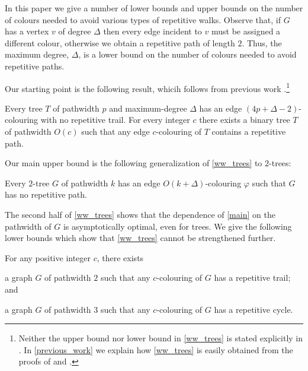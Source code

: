\documentclass[kpfonts]{patmorin}
\begin{document}
In this paper we give a number of lower bounds and upper bounds on the number of colours needed to avoid various types of repetitive walks. Observe that, if $G$ has a vertex $v$ of degree $\Delta$ then every edge incident to $v$ must be assigned a different colour, otherwise we obtain a repetitive path of length $2$. Thus, the maximum degree, $\Delta$, is a lower bound on the number of colours needed to avoid repetitive paths.

Our starting point is the following result, whicih follows from previous work \cite{wilson.wood:anagram-free,kamcev.luczak.ea:anagram-free}.\footnote{Neither the upper bound nor lower bound in \cref{ww_trees} is stated explicitly in \cite{wilson.wood:anagram-free,kamcev.luczak.ea:anagram-free}.  In \cref{previous_work} we explain how \cref{ww_trees} is easily obtained from the proofs of \cite[Theorems~2 and 13]{wilson.wood:anagram-free} and \cite[Proposition~2.1]{kamcev.luczak.ea:anagram-free}.}

\begin{thm}\label{ww_trees}
    Every tree $T$ of pathwidth $p$ and maximum-degree $\Delta$ has an edge $(4p+\Delta-2)$-colouring with no repetitive trail.  For every integer $c$ there exists a binary tree $T$ of pathwidth $O(c)$ such that any edge $c$-colouring of $T$ contains a repetitive path.
\end{thm}

Our main upper bound is the following generalization of \cref{ww_trees} to $2$-trees:

\begin{thm}\label{main}
    Every $2$-tree $G$ of pathwidth $k$ has an edge $O(k+\Delta)$-colouring $\varphi$ such that $G$ has no repetitive path.
\end{thm}

The second half of \cref{ww_trees} shows that the dependence of \cref{main} on the pathwidth of $G$ is asymptotically optimal, even for trees.  We give the following lower bounds which show that \cref{ww_trees} cannot be strengthened further.

\begin{thm}\label{lower-bounds}
    For any positive integer $c$, there exists
    \begin{compactenum}[(a)]
        \item a graph $G$ of pathwidth $2$ such that any $c$-colouring of $G$ has a repetitive trail; and \label{trail_lower_bound}
        \item a graph $G$ of pathwidth $3$ such that any $c$-colouring of $G$ has a repetitive cycle.\label{lower_bound}
    \end{compactenum}
\end{thm}
\end{document}
